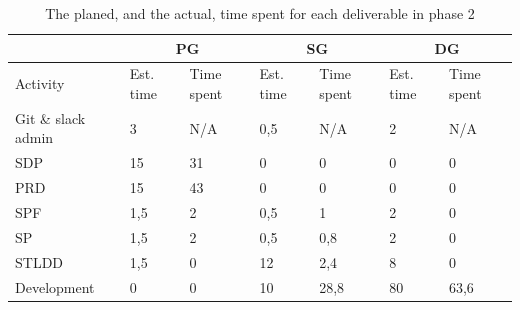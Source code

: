\documentclass{article}
\begin{document}
\begin{table}[h!]
    \centering
    \begin{tabular}{l|l|l|l|l|l|l|}
    \cline{2-7}
    & \multicolumn{2}{c|}{PG} & \multicolumn{2}{c|}{SG} & \multicolumn{2}{c|}{DG} \\ \hline
    \multicolumn{1}{|l|}{Activity} & Est. time & Time spent &  Est. time & Time spent & Est. time & Time spent        \\ \hline
    \multicolumn{1}{|l|}{Git \& slack admin} & 3 & N/A & 0,5 & N/A  & 2 & N/A\\ \hline
    \multicolumn{1}{|l|}{SDP} & 15 & 31 & 0 & 0 & 0 & 0 \\ \hline
    \multicolumn{1}{|l|}{PRD} & 15 & 43 & 0 & 0 & 0 & 0 \\ \hline
    \multicolumn{1}{|l|}{SPF} & 1,5 & 2 & 0,5 & 1 & 2 & 0\\ \hline
    \multicolumn{1}{|l|}{SP} & 1,5 & 2 & 0,5 & 0,8 & 2 & 0 \\ \hline
    \multicolumn{1}{|l|}{STLDD} & 1,5 & 0 & 12 & 2,4 & 8 & 0 \\ \hline
   \multicolumn{1}{|l|}{Development} & 0 & 0 & 10 & 28,8 & 80 & 63,6\\ \hline    
\end{tabular}
\caption{The planed, and the actual, time spent for each deliverable in phase 2}
\label{tab:timeSpent2}
\end{table}
\end{document}
